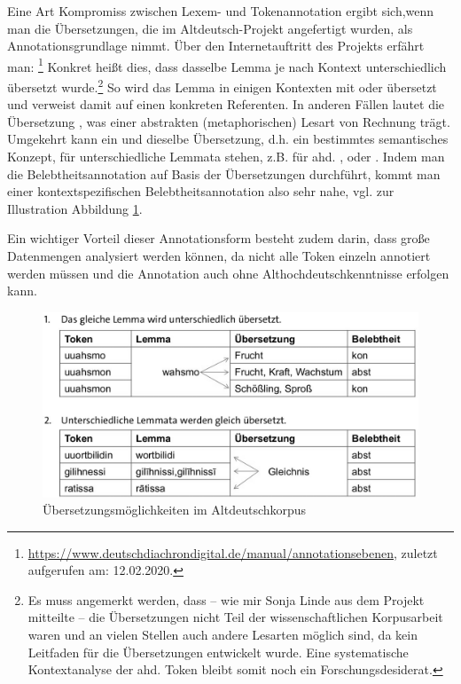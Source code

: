 Eine Art Kompromiss zwischen Lexem- und Tokenannotation ergibt sich,\linebreak wenn man die Übersetzungen, die im Altdeutsch-Projekt angefertigt wurden, als Annotationsgrundlage nimmt.  
Über den Internetauftritt des Projekts erfährt man: \footnote{\url{https://www.deutschdiachrondigital.de/manual/annotationsebenen}, zuletzt aufgerufen am: 12.02.2020.} Konkret heißt dies, dass dasselbe Lemma je nach Kontext unterschiedlich übersetzt wurde.\footnote{Es muss angemerkt werden, dass -- wie mir Sonja Linde aus dem Projekt mitteilte -- die Übersetzungen nicht Teil der wissenschaftlichen Korpusarbeit waren und an vielen Stellen auch andere Lesarten möglich sind, da kein Leitfaden für die Übersetzungen entwickelt wurde. Eine systematische Kontextanalyse der ahd. Token bleibt somit noch ein Forschungsdesiderat.} So wird das Lemma  in einigen Kontexten mit  oder  übersetzt und verweist damit auf einen konkreten Referenten. In anderen Fällen lautet die Übersetzung , was einer  abstrakten (metaphorischen) Lesart von  Rechnung trägt. Umgekehrt kann ein und dieselbe Übersetzung, d.h. ein bestimmtes semantisches Konzept, für unterschiedliche Lemmata stehen, z.B.  für ahd. ,  oder . Indem man die Belebtheitsannotation auf Basis der Übersetzungen durchführt, kommt man einer kontextspezifischen Belebtheitsannotation also sehr nahe, vgl. zur Illustration Abbildung \ref{abb:konzept-ddd}. 

Ein wichtiger Vorteil dieser Annotationsform besteht zudem darin, dass große Datenmengen analysiert werden können, da nicht alle Token einzeln annotiert werden müssen und die Annotation auch ohne Althochdeutschkenntnisse erfolgen kann.


\begin{figure}[h]
\begin{center}
  \includegraphics[width=10 cm]{images/konzept-ddd-sw.jpg}
\caption {Übersetzungsmöglichkeiten im Altdeutschkorpus}
\label{abb:konzept-ddd}
\end{center}
\end{figure} 
 

